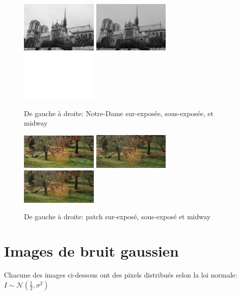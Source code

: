 \documentclass{article}
\begin{document}
\begin{figure}[h]
	\includegraphics[width=0.33\textwidth]{NotreDame1.png}
	\includegraphics[width=0.33\textwidth]{NotreDame2.png}
	\includegraphics[width=0.33\textwidth]{NotreDame1M.png}
  \caption{De gauche à droite: Notre-Dame sur-exposée, sous-exposée, et midway}
\end{figure}

\begin{figure}[h]
	\includegraphics[width=0.33\textwidth]{P1c.jpg}
	\includegraphics[width=0.33\textwidth]{P2c.jpg}
	\includegraphics[width=0.33\textwidth]{P1Mc.png}
  \caption{De gauche à droite: patch sur-exposé, sous-exposé et midway}
\end{figure}

\section{Images de bruit gaussien}
Chacune des images ci-dessous ont des pixels distribués selon la loi normale: $I \sim \mathcal{N}(\frac{1}{2}, \sigma^2)$
\end{document}
